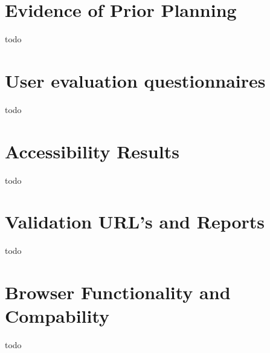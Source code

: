 \documentclass[letterpaper,12pt]{article}
\begin{document}
\begin{appendices}

\clearpage
\section{Evidence of Prior Planning}
todo

\clearpage
\section{User evaluation questionnaires}
todo

\clearpage
\section{Accessibility Results}
todo

\clearpage
\section{Validation URL's and Reports}
todo

\clearpage
\section{Browser Functionality and Compability}
todo

\newpage



\end{appendices}
\end{document}
